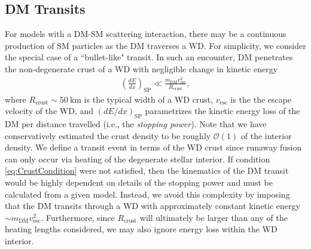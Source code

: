 \documentclass[twocolumn,showpacs,preprintnumbers,amsmath,amssymb,prd]{revtex4}
\newcommand{\OO}{\mathcal{O}}
\begin{document}
\subsection{DM Transits}
\label{sec:transit}
For models with a DM-SM scattering interaction, there may be a continuous production of SM particles as the DM traverses a WD.
For simplicity, we consider the special case of a ``bullet-like" transit.
In such an encounter, DM penetrates the non-degenerate crust of a WD with negligible change in kinetic energy
\begin{align}
\label{eq:CrustCondition}
  \left( \frac{d E}{d x} \right)_\text{SP} \ll 
  \frac{m_\text{DM} v^2_\text{esc}}{R_\text{crust}},
\end{align}
where $R_\text{crust} \sim 50 ~\text{km}$ is the typical width of a WD crust, $v_\text{esc}$ is the the escape velocity of the WD, and $(dE/dx)_\text{SP}$ parametrizes the kinetic energy loss of the DM per distance travelled (i.e., the \emph{stopping power}).
Note that we have conservatively estimated the crust density to be roughly $\OO(1)$ of the interior density.
We define a transit event in terms of the WD crust since runaway fusion can only occur via heating of the degenerate stellar interior.
If condition \eqref{eq:CrustCondition} were not satisfied, then the kinematics of the DM transit would be highly dependent on details of the stopping power and must be calculated from a given model.
Instead, we avoid this complexity by imposing that the DM transits through a WD with approximately constant kinetic energy $\sim m_\text{DM} v^2_\text{esc}$.
Furthermore, since $R_\text{crust}$ will ultimately be larger than any of the heating lengths considered, we may also ignore energy loss within the WD interior.
\end{document}
